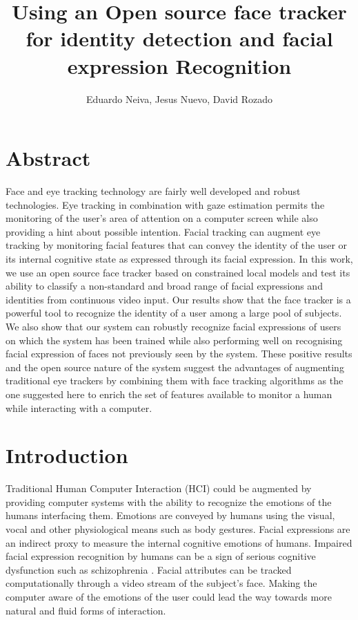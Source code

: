 \documentclass[]{article}
\title{Using an Open source face tracker for identity detection and facial expression Recognition}
\author{Eduardo Neiva, Jesus Nuevo, David Rozado}
\begin{document}
\maketitle

\section{Abstract}
Face and eye tracking technology are fairly well developed and robust technologies. Eye tracking in combination with
gaze estimation permits the monitoring of the user's area of attention on a computer screen while also providing a hint
about possible intention. Facial tracking can augment eye tracking by monitoring facial features that can convey the
identity of the user or its internal cognitive state as expressed through its facial expression. In this work, we use an
open source face tracker based on constrained local models and test its ability to classify a non-standard and broad
range of facial expressions and identities from continuous video input. Our results show that the face tracker is a
powerful tool to recognize the identity of a user among a large pool of subjects. We also show that our system can
robustly recognize facial expressions of users on which the system has been trained while also performing well on
recognising facial expression of faces not previously seen by the system. These positive results and the open source
nature of the system suggest the advantages of augmenting traditional eye trackers by combining them with face tracking
algorithms as the one suggested here to enrich the set of features available to monitor a human while interacting with a
computer.


\section{Introduction}
Traditional Human Computer Interaction (HCI) could be augmented by providing computer systems with the ability to
recognize the emotions of the humans interfacing them. Emotions are conveyed by humans using the visual, vocal
and other physiological means such as body gestures. Facial expressions are an indirect proxy to measure the internal
cognitive emotions of humans. Impaired facial expression recognition by humans can be a sign of serious cognitive
dysfunction such as schizophrenia \cite{Edwards2002789}.  Facial attributes can be tracked computationally through a
video stream of the subject's face. Making the computer aware of the emotions of the user could lead the way towards
more natural and fluid forms of interaction.
\end{document}

